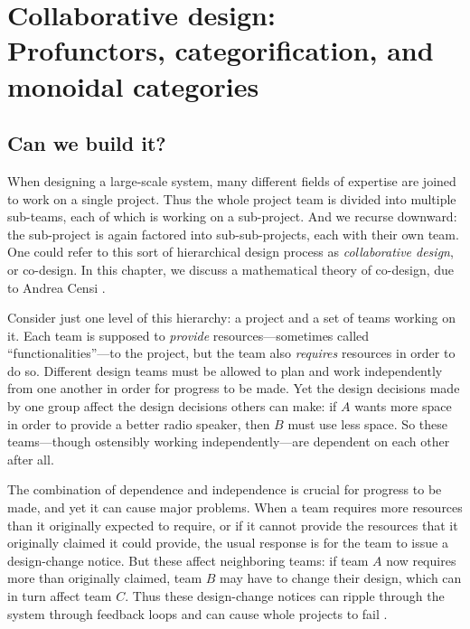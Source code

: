 \documentclass[7Sketches]{subfiles}
\begin{document}
\setcounter{chapter}{3}%
\chapter[Co-design: profunctors and monoidal categories]{Collaborative design:\\Profunctors, categorification, and
monoidal categories}%
\label{chap.codesign}%
%

\section{Can we build it?}

When designing a large-scale system, many different fields of expertise are
joined to work on a single project. Thus the whole project team is divided into
multiple sub-teams, each of which is working on a sub-project. And we recurse
downward: the sub-project is again factored into sub-sub-projects, each with
their own team. One could refer to this sort of hierarchical design process as \emph{collaborative design}, or co-design. In this
chapter, we discuss a mathematical theory of co-design, due to Andrea Censi \cite{Censi:2015a}.%

Consider just one level of this hierarchy: a project and a set of teams working
on it. Each team is supposed to \emph{provide} resources---sometimes called
``functionalities''---to the project, but the team also \emph{requires} resources in
order to do so. Different design teams must be allowed to plan and work
independently from one another in order for progress to be made. Yet the design
decisions made by one group affect the design decisions others can make: if $A$
wants more space in order to provide a better radio speaker, then $B$ must use less space. So
these teams---though ostensibly working independently---are dependent on each other
after all.%

The combination of dependence and independence is crucial for progress to be
made, and yet it can cause major problems. When a team requires more resources
than it originally expected to require, or if it cannot provide the resources
that it originally claimed it could provide, the usual response is for the team
to issue a design-change notice. But these affect neighboring teams: if team $A$
now requires more than originally claimed, team $B$ may have to change their design, which can in turn affect team $C$. Thus these design-change notices can ripple through the system through feedback loops and can cause whole projects to fail \cite{Subrahmanian.Lee.Granger:2015a}.
\end{document}
